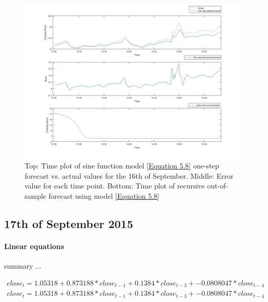 \documentclass[13pt]{report}
\begin{document}
\begin{figure}[H]
\centering
\label{VWNonlinear16fig}
\includegraphics[width=\textwidth]{16nonlinear}
\caption{Top: Time plot of sine function model \ref{Equation 5.8} one-step forecast vs. actual values for the 16th of September. Middle: Error value for each time point. Bottom: Time plot of recursive out-of-sample forecast using model \ref{Equation 5.8}}
\end{figure}

\subsection{17th of September 2015}
\paragraph{Linear equations}\hfill \break
summary ...

\begin{equation}
\begin{align*}
close_{t} = 1.05318 + 0.873188 * close_{t-1} + 0.1384 * close_{t-3} + -0.0808047 * close_{t-4} 
\end{align*}
\label{Equation 5.9}
\end{equation}
\begin{equation}
\begin{align*}
close_{t} = 1.05318 + 0.873188 * close_{t-1} + 0.1384 * close_{t-3} + -0.0808047 * close_{t-4} 
\end{align*}
\label{Equation 5.10}
\end{equation}
\end{document}
